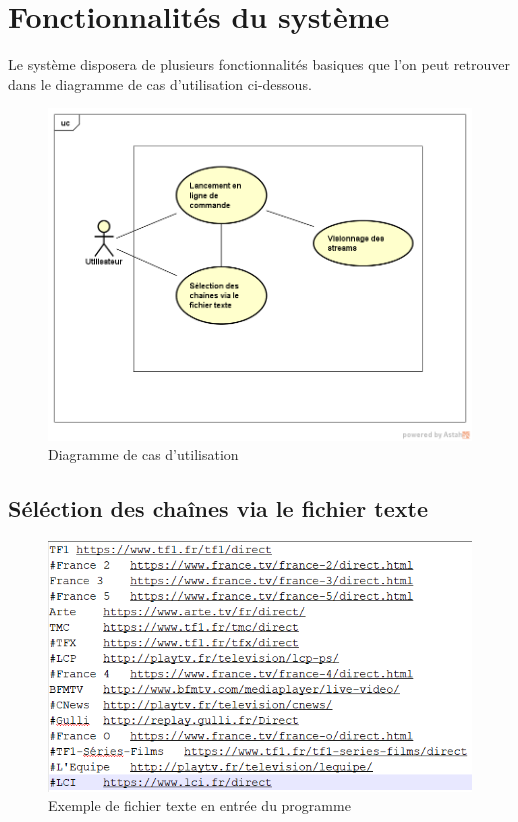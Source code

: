 \documentclass{polytech/polytech}
\begin{document}
\section{Fonctionnalités du système}

Le système disposera de plusieurs fonctionnalités basiques que l’on peut retrouver dans le
diagramme de cas d’utilisation ci-dessous.

\begin{figure}
	\includegraphics[scale=0.75]{images/UseCase2}
	\caption{Diagramme de cas d'utilisation}
	\label{fig:diagUseCase}
\end{figure}


\subsection{Séléction des chaînes via le fichier texte}

\begin{figure}
	\includegraphics[scale=0.5]{images/textFile.png}
	\caption{Exemple de fichier texte en entrée du programme}
	\label{fig:textFile}
\end{figure}
\end{document}
